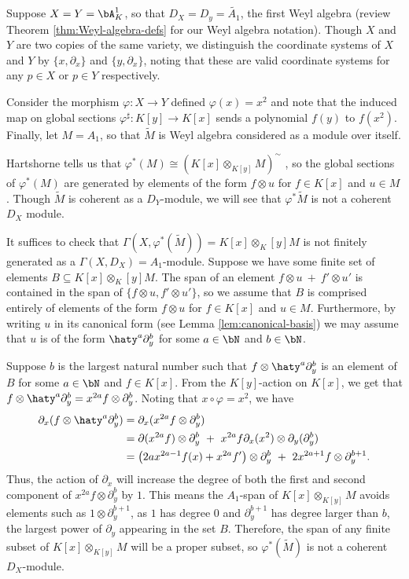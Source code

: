 \begin{example}\label{example:badly-behaved-inv-img}
	Suppose $X = Y = \bA^1_K$, so that $D_X = D_y = \tilde{A_1}$, the first Weyl algebra (review Theorem \ref{thm:Weyl-algebra-defs} for our Weyl algebra notation). Though $X$ and $Y$ are two copies of the same variety, we distinguish the coordinate systems of $X$ and $Y$ by $\{x,\partial_x\}$ and $\{y,\partial_x\}$, noting that these are valid coordinate systems for any $p\in X$ or $p \in Y$ respectively. 
	
	Consider the morphism $\varphi:X\to Y$ defined $\varphi(x) = x^2$ and note that the induced map on global sections $\varphi^\sharp:K[y]\to K[x]$ sends a polynomial $f(y)$ to $f(x^2)$. Finally, let $M = A_1$, so that $\tilde{M}$ is Weyl algebra considered as a module over itself.

	Hartshorne tells us that $\varphi^*(M) \cong (K[x] \otimes_{K[y]} M)^\sim$ \cite[Proposition 5.2]{hartshorne}, so the global sections of $\varphi^*(M)$ are generated by elements of the form $f\otimes u$ for $f \in K[x]$ and $u \in M$. Though $\tilde{M}$ is coherent as a $D_Y$-module, we will see that $\varphi^*\tilde{M}$ is not a coherent $D_X$ module.

	It suffices to check that $\Gamma(X,\varphi^*(\tilde{M})) = K[x]\otimes_K[y] M$ is not finitely generated as a $\Gamma(X,D_X) = A_1$-module. Suppose we have some finite set of elements $B \subseteq K[x]\otimes_K[y] M$. The span of an element $f\otimes u ~+~ f'\otimes u'$ is contained in the span of $\{f\otimes u,f'\otimes u'\}$, so we assume that $B$ is comprised entirely of elements of the form $f\otimes u$ for $f \in K[x]$ and $u \in M$. Furthermore, by writing $u$ in its canonical form (see Lemma \ref{lem:canonical-basis}) we may assume that $u$ is of the form $\haty^a\partial_y^b$ for some $a\in \bN$ and $b \in \bN$.

	Suppose $b$ is the largest natural number such that $f\otimes \haty^a\partial_y^b$ is an element of $B$ for some $a\in \bN$ and $f \in K[x]$. From the $K[y]$-action on $K[x]$, we get that $f\otimes \haty^a\partial_y^b = x^{2a}f\otimes \partial_y^b$. Noting that $x\circ \varphi = x^2$, we have
	\begin{align*}
		\partial_x(f\otimes \haty^a\partial_y^b)
		  &= \partial_x(x^{2a}f\otimes \partial_y^b) \\
		  &= \partial(x^{2a}f) \otimes \partial_y^b ~+~ x^{2a}f\partial_x(x^2)\otimes \partial_y(\partial_y^b)\\
		  &= \left(2ax^{2a-1}f(x) + x^{2a}f'\right)\otimes \partial_y^{b} ~+~ 2x^{2a+1}f\otimes \partial_y^{b+1}.
	\end{align*}
	Thus, the action of $\partial_x$ will increase the degree of both the first and second component of $x^{2a}f\otimes \partial_y^b$ by $1$. This means the $A_1$-span of $K[x]\otimes_{K[y]} M$ avoids elements such as $1\otimes \partial_y^{b+1}$, as $1$ has degree 0 and $\partial_y^{b+1}$ has degree larger than $b$, the largest power of $\partial_y$ appearing in the set $B$. Therefore, the span of any finite subset of $K[x]\otimes_{K[y]}M$ will be a proper subset, so $\varphi^*(\tilde{M})$ is not a coherent $D_X$-module.
\end{example}

